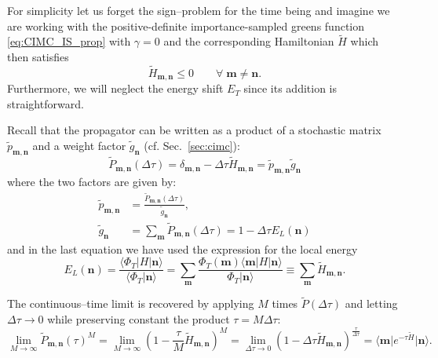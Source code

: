 For simplicity let us forget the sign--problem for the time being and imagine we are working with the positive-definite importance-sampled greens function \eqref{eq:CIMC_IS_prop} 
with $\gamma=0$ and the corresponding Hamiltonian $\widetilde{H}$ which then satisfies
\begin{equation}
\label{eq:hoffdpd}
\widetilde{H}_{\mathbf{m},\mathbf{n}} \leq 0 \quad\quad \forall \; \mathbf{m}\neq \mathbf{n} .
\end{equation}
Furthermore, we will neglect the energy shift $E_T$ since its addition is straightforward.

Recall that the propagator can be written as a product of a stochastic matrix $\widetilde{p}_{\mathbf{m},\mathbf{n}}$ and a weight factor $\widetilde{g}_{\mathbf{n}}$ (cf. Sec.~\ref{sec:cimc}):
\begin{equation}
\widetilde{P}_{\mathbf{m},\mathbf{n}}(\Delta\tau) = \delta_{\mathbf{m},\mathbf{n}}- \Delta  \tau \widetilde{H}_{\mathbf{m},\mathbf{n}} = \widetilde{p}_{\mathbf{m},\mathbf{n}} \widetilde{g}_{\mathbf{n}}
\end{equation}
where the two factors are given by:
\begin{equation}
\begin{split}
\widetilde{p}_{\mathbf{m},\mathbf{n}}&=\frac{\widetilde{P}_{\mathbf{m},\mathbf{n}}(\Delta\tau)}{\widetilde{g}_{\mathbf{n}}},\\
\widetilde{g}_{\mathbf{n}} &= \sum_{\mathbf{m}} \widetilde{P}_{\mathbf{m},\mathbf{n}}(\Delta\tau)=1-\Delta\tau E_L({\mathbf{n}})
\end{split}
\end{equation}
and in the last equation we have used the expression for the local energy
\begin{equation}
\label{eq:elocal}
E_L({\mathbf{n}}) = \frac{\langle \Phi_T \lvert H \rvert \mathbf{n}\rangle}{\langle\Phi_T\vert\mathbf{n}\rangle} = \sum_\mathbf{m} \frac{\Phi_T (\mathbf{m}) \langle\mathbf{m}\lvert H \rvert \mathbf{n}\rangle}{\Phi_T\vert\mathbf{n}\rangle} \equiv \sum_\mathbf{m} \widetilde{H}_{\mathbf{m},\mathbf{n}} .
\end{equation}

The continuous--time limit is recovered by applying $M$ times $\widetilde{P}(\Delta\tau)$ and letting $\Delta \tau \to 0$ while preserving constant the product $\tau=M\Delta\tau$:
\begin{equation}
\lim_{M \to \infty} \widetilde{P}_{\mathbf{m},\mathbf{n}}(\tau)^M = \lim_{M \to \infty} \left( 1 - \frac{\tau}{M}\widetilde{H}_{\mathbf{m},\mathbf{n}} \right)^{M}
= \lim_{\Delta\tau \to 0} \left( 1 - \Delta\tau \widetilde{H}_{\mathbf{m},\mathbf{n}} \right)^{\frac{\tau}{\Delta\tau}}
= \langle \mathbf{m} \lvert e^{-\tau \widetilde{H}} \rvert \mathbf{n} \rangle .%
\end{equation}

